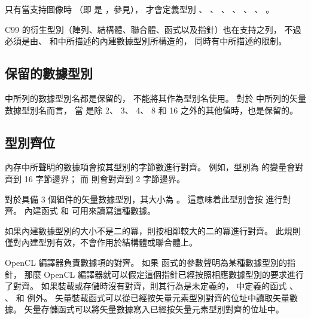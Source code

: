 {}

\startnotepar
只有當支持圖像時
（即  是 ，參見），
才會定義型別 、 、 、
 、 、 、
 。
\stopnotepar

C99 的衍生型別（陣列、結構體、聯合體、函式以及指針）也在支持之列，
不過必須是由、
和中所描述的內建數據型別所構造的，
同時有中所描述的限制。

\subsection{保留的數據型別}

 中所列的數據型別名都是保留的，
不能將其作為型別名使用。
對於 中所列的矢量數據型別名而言，
當  是除 2、 3、 4、 8 和 16 之外的其他值時，也是保留的。

{}

\subsection[sec:alignmentOfTypes]{型別齊位}

內存中所聲明的數據項會按其型別的字節數進行對齊。
例如，型別為  的變量會對齊到 16 字節邊界；
而  則會對齊到 2 字節邊界。

對於具備 3 個組件的矢量數據型別，其大小為 。
這意味着此型別會按  進行對齊。
內建函式  和  可用來讀寫這種數據。

如果內建數據型別的大小不是二的冪，則按相鄰較大的二的冪進行對齊。
此規則僅對內建型別有效，不會作用於結構體或聯合體上。

OpenCL 編譯器負責數據項的對齊。
如果  函式的參數聲明為某種數據型別的指針，
那麼 OpenCL 編譯器就可以假定這個指針已經按照相應數據型別的要求進行了對齊。
如果裝載或存儲時沒有對齊，則其行為是未定義的，
中定義的函式 、 、
  和  例外。
矢量裝載函式可以從已經按矢量元素型別對齊的位址中讀取矢量數據。
矢量存儲函式可以將矢量數據寫入已經按矢量元素型別對齊的位址中。

